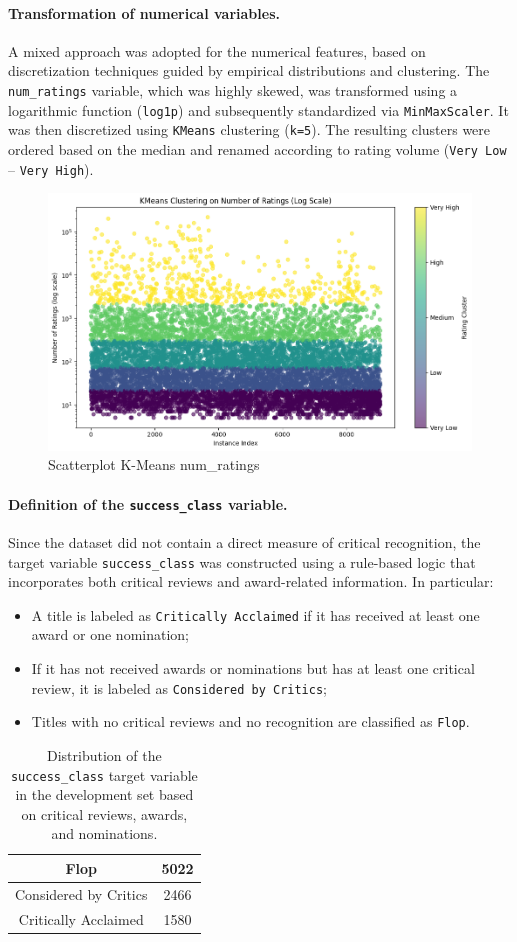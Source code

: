 \documentclass[10pt]{article}
\begin{document}
\paragraph{Transformation of numerical variables.}
A mixed approach was adopted for the numerical features, based on discretization techniques guided by empirical distributions and clustering.
The \texttt{num\_ratings} variable, which was highly skewed, was transformed using a logarithmic function (\texttt{log1p}) and subsequently standardized via \texttt{MinMaxScaler}. It was then discretized using \texttt{KMeans} clustering (\texttt{k=5}). The resulting clusters were ordered based on the median and renamed according to rating volume (\texttt{Very Low} -- \texttt{Very High}).

\begin{figure}[H]
    \centering
    \includegraphics[width=0.4\linewidth]{Kmeans_num_rating.png}
    \caption{Scatterplot K-Means num\_ratings}
    \label{fig:enter-label}
\end{figure}


\paragraph{Definition of the \texttt{success\_class} variable.}

Since the dataset did not contain a direct measure of critical recognition, the target variable \texttt{success\_class} was constructed using a rule-based logic that incorporates both critical reviews and award-related information. In particular:
\begin{itemize}
  \item A title is labeled as \texttt{Critically Acclaimed} if it has received at least one award or one nomination;
  \item If it has not received awards or nominations but has at least one critical review, it is labeled as \texttt{Considered by Critics};
  \item Titles with no critical reviews and no recognition are classified as \texttt{Flop}.
\end{itemize}

\begin{table}[H]
    \centering
    \begin{tabular}{cc}
        Flop & 5022\\
        \hline
        Considered by Critics & 2466 \\
        \hline
        Critically Acclaimed & 1580\\
    \end{tabular}
    \caption{Distribution of the \texttt{success\_class} target variable in the development set based on critical reviews, awards, and nominations.}

    \label{tab:my_label}
\end{table}
\end{document}
